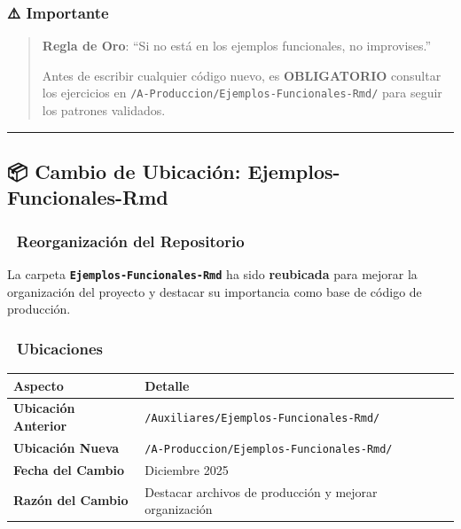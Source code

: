 \documentclass[
]{article}
\begin{document}
\subsubsection{\texorpdfstring{⚠️
\textbf{Importante}}{⚠️ Importante}}\label{importante}

\begin{quote}
\textbf{Regla de Oro}: ``Si no está en los ejemplos funcionales, no
improvises.''

Antes de escribir cualquier código nuevo, es \textbf{OBLIGATORIO}
consultar los ejercicios en
\texttt{/A-Produccion/Ejemplos-Funcionales-Rmd/} para seguir los
patrones validados.
\end{quote}

\begin{center}\rule{0.5\linewidth}{0.5pt}\end{center}

\subsection{\texorpdfstring{📦 \textbf{Cambio de Ubicación:
Ejemplos-Funcionales-Rmd}}{📦 Cambio de Ubicación: Ejemplos-Funcionales-Rmd}}\label{cambio-de-ubicaciuxf3n-ejemplos-funcionales-rmd}

\subsubsection{\texorpdfstring{🔄 \textbf{Reorganización del
Repositorio}}{🔄 Reorganización del Repositorio}}\label{reorganizaciuxf3n-del-repositorio}

La carpeta \textbf{\texttt{Ejemplos-Funcionales-Rmd}} ha sido
\textbf{reubicada} para mejorar la organización del proyecto y destacar
su importancia como base de código de producción.

\subsubsection{\texorpdfstring{📍
\textbf{Ubicaciones}}{📍 Ubicaciones}}\label{ubicaciones}

\begin{longtable}[]{@{}
  >{\raggedright\arraybackslash}p{}
  >{\raggedright\arraybackslash}p{}@{}}
\toprule\noalign{}
\begin{minipage}[b]{\linewidth}\raggedright
Aspecto
\end{minipage} & \begin{minipage}[b]{\linewidth}\raggedright
Detalle
\end{minipage} \\
\midrule\noalign{}
\endhead
\bottomrule\noalign{}
\endlastfoot
\textbf{Ubicación Anterior} &
\texttt{/Auxiliares/Ejemplos-Funcionales-Rmd/} \\
\textbf{Ubicación Nueva} &
\texttt{/A-Produccion/Ejemplos-Funcionales-Rmd/} \\
\textbf{Fecha del Cambio} & Diciembre 2025 \\
\textbf{Razón del Cambio} & Destacar archivos de producción y mejorar
organización \\
\end{longtable}
\end{document}
